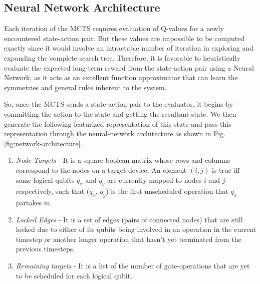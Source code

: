 \documentclass[%
 reprint,
amsmath,amssymb,
pra,
]{revtex4-2}
\begin{document}
\subsection{\label{sec:method-model}Neural Network Architecture}

Each iteration of the MCTS requires evaluation of Q-values for a newly encountered state-action pair. But these values are impossible to be computed exactly since it would involve an intractable number of iteration in exploring and expanding the complete search tree. Therefore, it is favorable to heuristically evaluate the expected long-term reward from the state-action pair using a Neural Network, as it acts as an excellent function approximator that can learn the symmetries and general rules inherent to the system.

So, once the MCTS sends a state-action pair to the evaluator, it begins by committing the action to the state and getting the resultant state. We then generate the following featurized representation of this state and pass this representation through the neural-network architecture as shown in Fig. \ref{fig:network-architecture}.

\begin{enumerate}[label=(\roman*)]
    \item \textit{Node Targets} - It is a square boolean matrix whose rows and columns correspond to the nodes on a target device. An element $(i, j)$ is true iff some logical qubits $q_x$ and $q_y$ are currently mapped to nodes $i$ and $j$ respectively, such that ($q_x$, $q_y$) is the first unscheduled operation that $q_x$ partakes in.
    \item \textit{Locked Edges} - It is a set of edges (pairs of connected nodes) that are still locked due to either of its qubits being involved in an operation in the current timestep or another longer operation that hasn't yet terminated from the previous timesteps.
    \item \textit{Remaining targets} - It is a list of the number of gate-operations that are yet to be scheduled for each logical qubit. 
\end{enumerate}

\end{document}
